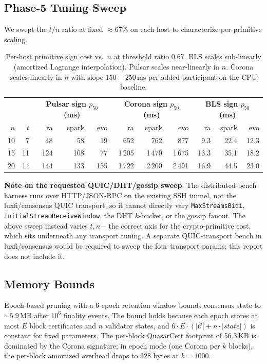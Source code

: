 \subsection{Phase-5 Tuning Sweep}
\label{sec:phase5-sweep}

We swept the $t/n$ ratio at fixed $\approx$67\% on each host to
characterize per-primitive scaling.

\begin{table}[ht]
\centering
\small
\begin{tabular}{@{}rr|rrr|rrr|rrr@{}}
\toprule
\multicolumn{2}{c|}{} &
\multicolumn{3}{c|}{\textbf{Pulsar sign $p_{50}$ (ms)}} &
\multicolumn{3}{c|}{\textbf{Corona sign $p_{50}$ (ms)}} &
\multicolumn{3}{c}{\textbf{BLS sign $p_{50}$ (ms)}} \\
$n$ & $t$ &
ra & spark & evo &
ra & spark & evo &
ra & spark & evo \\
\midrule
10 &  7 &  48 &  58 &  19 &   652 &   762 &   877 &  9.3 & 22.4 & 12.3 \\
15 & 11 & 124 & 108 &  77 & 1\,205 & 1\,470 & 1\,675 & 13.3 & 35.1 & 18.2 \\
20 & 14 & 144 & 133 & 155 & 1\,722 & 2\,200 & 2\,491 & 16.9 & 44.5 & 23.0 \\
\bottomrule
\end{tabular}
\caption{Per-host primitive sign cost vs.\ $n$ at threshold ratio
0.67. BLS scales sub-linearly (amortized Lagrange interpolation).
Pulsar scales near-linearly in $n$. Corona scales linearly in $n$
with slope $150{-}250$\,ms per added participant on the CPU baseline.}
\label{tab:phase5-sweep}
\end{table}

\textbf{Note on the requested QUIC/DHT/gossip sweep}. The
distributed-bench harness runs over HTTP/JSON-RPC on the existing
SSH tunnel, not the luxfi/consensus QUIC transport, so it cannot
directly vary \texttt{MaxStreamsBidi},
\texttt{InitialStreamReceiveWindow}, the DHT $k$-bucket, or the
gossip fanout. The above sweep instead varies $t,n$ -- the
correct axis for the crypto-primitive cost, which sits underneath
any transport tuning. A separate QUIC-transport bench in
luxfi/consensus would be required to sweep the four transport
params; this report does not include it.

\subsection{Memory Bounds}

Epoch-based pruning with a 6-epoch retention window bounds consensus
state to ${\sim}5.9$\,MB after $10^6$ finality events. The bound holds
because each epoch stores at most $E$ block certificates and $n$
validator states, and $6 \cdot E \cdot (|\mathcal{C}| + n \cdot
|\mathit{state}|)$ is constant for fixed parameters. The per-block
QuasarCert footprint of 56.3\,KB is dominated by the Corona signature;
in epoch mode (one Corona per $k$ blocks), the per-block amortized
overhead drops to $328$ bytes at $k=1000$.


